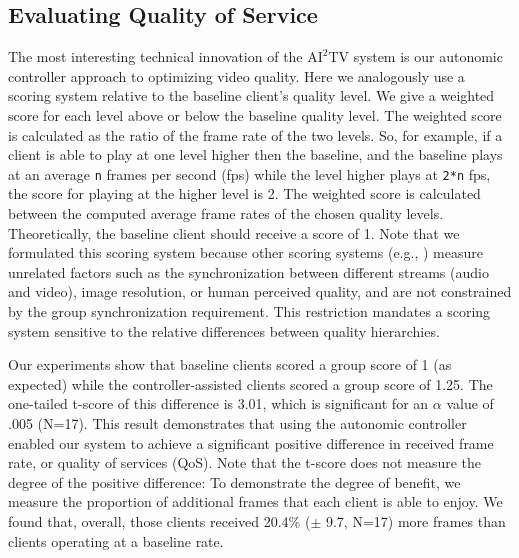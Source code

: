 \documentclass{sig-alternate}
\begin{document}



\subsection{Evaluating Quality of Service} 

The most interesting technical innovation of the $\mathrm{AI}^2$TV
system is our autonomic controller approach to optimizing video
quality.  Here we analogously use a scoring system relative to the
baseline client's quality level.  We give a weighted score for each
level above or below the baseline quality level.  The weighted score
is calculated as the ratio of the frame rate of the two levels.  So,
for example, if a client is able to play at one level higher then the
baseline, and the baseline plays at an average \texttt{n} frames per
second (fps) while the level higher plays at \texttt{2*n} fps, the
score for playing at the higher level is 2.  The weighted score is
calculated between the computed average frame rates of the chosen
quality levels.  Theoretically, the baseline client should receive a
score of 1.  Note that we formulated this scoring system because other
scoring systems (e.g., \cite{BAQAI,CORTE,CONWAY2000}) measure
unrelated factors such as the synchronization between different
streams (audio and video), image resolution, or human perceived
quality, and are not constrained by the group synchronization
requirement.  This restriction mandates a scoring system sensitive to
the relative differences between quality hierarchies.


Our experiments show that baseline clients scored a group score of 1
(as expected) while the controller-assisted clients scored a group
score of 1.25.  The one-tailed t-score of this difference is 3.01,
which is significant for an $\alpha$ value of .005 (N=17).  This
result demonstrates that using the autonomic controller enabled our
system to achieve a significant positive difference in received frame
rate, or quality of services (QoS).  Note that the t-score does not
measure the degree of the positive difference: To demonstrate the
degree of benefit, we measure the proportion of additional frames that
each client is able to enjoy.  We found that, overall, those clients
received 20.4\% ($\pm$ 9.7, N=17) more frames than clients operating
at a baseline rate.
\end{document}

